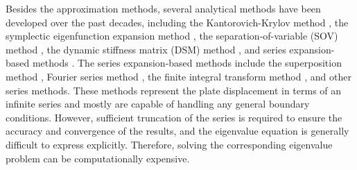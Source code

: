 \documentclass[preprint,12pt]{elsarticle}
\begin{document}
Besides the approximation methods, several analytical methods have been developed over the past decades, including the Kantorovich-Krylov method \cite{kantorovich1958approximate,kerr1968extension}, the symplectic eigenfunction expansion method \cite{zhong1995new,xing2009new2}, the separation-of-variable (SOV) method \cite{xing2009new}, the dynamic stiffness matrix (DSM) method \cite{banerjee1997dynamic}, and series expansion-based methods \cite{xing2022review}.
The series expansion-based methods include the superposition method \cite{timoshenko1940theory,gorman2005free}, Fourier series method \cite{khov2009accurate,li2009exact}, the finite integral transform method \cite{li2009finite,zhong2013free}, and other series methods. 
These methods represent the plate displacement in terms of an infinite series and mostly are capable of handling any general boundary conditions. 
However, sufficient truncation of the series is required to ensure the accuracy and convergence of the results, and the eigenvalue equation is generally difficult to express explicitly.
Therefore, solving the corresponding eigenvalue problem can be computationally expensive.
\end{document}
